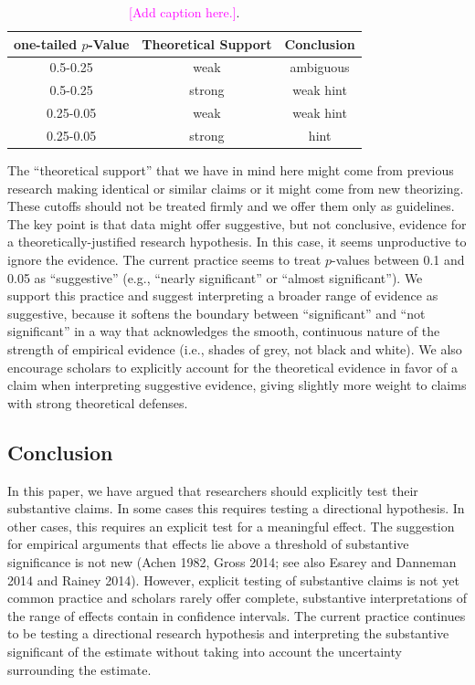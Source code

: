 \documentclass[12pt]{article}
\newcommand{\carlisle}[1]{\textcolor{magenta}{#1}}
\begin{document}
\begin{table}
\begin{center}
\begin{tabular}{|ccc|}
\hline
one-tailed $p$-Value & Theoretical Support & Conclusion\\ 
\hline
0.5-0.25& weak & ambiguous\\
0.5-0.25& strong & weak hint\\
0.25-0.05& weak & weak hint\\
0.25-0.05& strong & hint\\
\hline
\end{tabular}\caption{\carlisle{[Add caption here.]}.}\label{tab:hints}
\end{center}
\end{table}

The ``theoretical support'' that we have in mind here might come from previous research making identical or similar claims or it might come from new theorizing.  These cutoffs should not be treated firmly and we offer them only as guidelines. The key point is that data might offer suggestive, but not conclusive, evidence for a theoretically-justified research hypothesis. In this case, it seems unproductive to ignore the evidence. The current practice seems to treat $p$-values between 0.1 and 0.05 as ``suggestive'' (e.g., ``nearly significant'' or ``almost significant''). We support this practice and suggest interpreting a broader range of evidence as suggestive, because it softens the boundary between ``significant'' and ``not significant'' in a way that acknowledges the smooth, continuous nature of the strength of empirical evidence (i.e., shades of grey, not black and white). We also encourage scholars to explicitly account for the theoretical evidence in favor of a claim when interpreting suggestive evidence, giving slightly more weight to claims with strong theoretical defenses. 

\subsection*{Conclusion}

In this paper, we have argued that researchers should explicitly test their substantive claims. In some cases this requires testing a directional hypothesis. In other cases, this requires an explicit test for a meaningful effect. The suggestion for empirical arguments that effects lie above a threshold of substantive significance is not new (Achen 1982, Gross 2014; see also Esarey and Danneman 2014 and Rainey 2014). However, explicit testing of substantive claims is not yet common practice and scholars rarely offer complete, substantive interpretations of the range of effects contain in confidence intervals. The current practice continues to be testing a directional research hypothesis and interpreting the substantive significant of the estimate without taking into account the uncertainty surrounding the estimate. 
\end{document}
